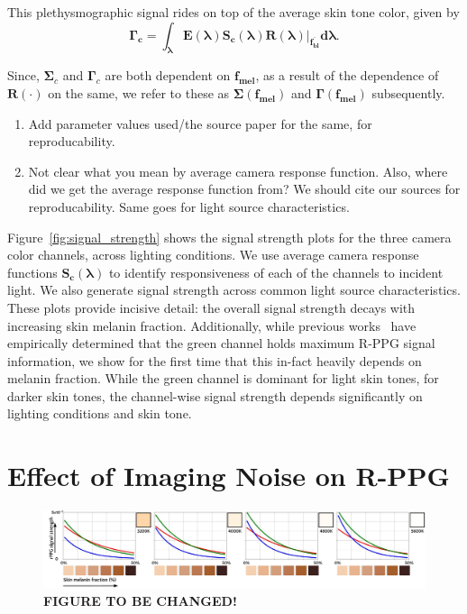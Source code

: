 This plethysmographic signal rides on top of the average skin tone color, given by
\begin{equation}
    \mathbf{\boldsymbol\Gamma_c=\boldsymbol\int_{\boldsymbol\lambda}E(\boldsymbol\lambda)S_{c}(\boldsymbol\lambda)R(\boldsymbol\lambda)\Big|_{\overline{f_{bl}}} d\boldsymbol\lambda}.
\end{equation}

Since, $\boldsymbol\Sigma_{c}$ and $\boldsymbol\Gamma_{c}$ are both dependent on $\mathbf{f_{mel}}$, as a result of the dependence of $\mathbf{R(\cdot)}$ on the same, we refer to these as $\mathbf{\boldsymbol\Sigma(f_{mel})}$ and $\mathbf{\boldsymbol\Gamma(f_{mel})}$ subsequently.

{\color{red} 
\begin{enumerate}
    \item Add parameter values used/the source paper for the same, for reproducability.
    \item Not clear what you mean by average camera response function. Also, where did we get the average response function from? We should cite our sources for reproducability. Same goes for light source characteristics.
\end{enumerate}
}

Figure~\ref{fig:signal_strength} shows the signal strength plots for the three camera color channels, across lighting conditions. We use average camera response functions $\mathbf{S_c(\boldsymbol\lambda)}$ to identify responsiveness of each of the channels to incident light. We also generate signal strength across common light source characteristics.  These plots provide incisive detail: the overall signal strength decays with increasing skin melanin fraction. Additionally, while previous works~\cite{verkruysse_remote_2008,haan_robust_2013,wang_algorithmic_2017} have empirically determined that the green channel holds maximum R-PPG signal information, we show for the first time that this in-fact heavily depends on melanin fraction. While the green channel is dominant for light skin tones, for darker skin tones, the channel-wise signal strength depends significantly on lighting conditions and skin tone.

\section{Effect of Imaging Noise on R-PPG}

\begin{figure}[t]
    \centering
    \includegraphics[width=\linewidth]{include/fig_strength.pdf}
    \caption{\textbf{FIGURE TO BE CHANGED!}}
    \label{fig:SNR_theory}
\end{figure}

